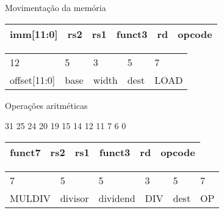 \begin{frame}{Movimentação da memória}
{\begin{center}
                \begin{tabular}{ | p{2cm} | p{1cm} | p{2cm} | p{2cm} | p{2cm} | p{2cm} | }
                    \hline
                    imm[11:0] & rs2 & rs1 & funct3 & rd & opcode \\
                    \hline
                \end{tabular}
                \begin{tabular}{p{3cm} p{2cm} p{2cm} p{2cm} p{2cm}}
                12 & 5 & 3 & 5 & 7 \\ 
                offset[11:0] & base & width & dest & LOAD    
                \end{tabular}

            \end{center}

        }

    \end{frame}

    \begin{frame}{Operações aritméticas}

        \begin{center}

            \begin{flushleft}
                \footnotesize
                31 \hspace{1.72cm} 25 24 \hspace{0.55cm} 20 19 \hspace{1.48cm} 15 14 \hspace{1.52cm} 12 11 \hspace{1.70cm} 7 6 \hspace{2cm} 0
                \normalsize
            \end{flushleft}

            \begin{tabular}{ | p{2cm} | p{1cm} | p{2cm} | p{2cm} | p{2cm} | p{2cm} | }
                \hline
                funct7 & rs2 & rs1 & funct3 & rd & opcode \\
                \hline
            \end{tabular}
            \begin{tabular}{ p{2cm} p{1cm} p{2cm} p{2cm} p{2cm} p{2cm}}
            7 & 5 & 5 & 3 & 5 & 7 \\ 
            MULDIV & divisor & dividend & DIV & dest & OP 
            \end{tabular}

        \end{center}

    \end{frame}

